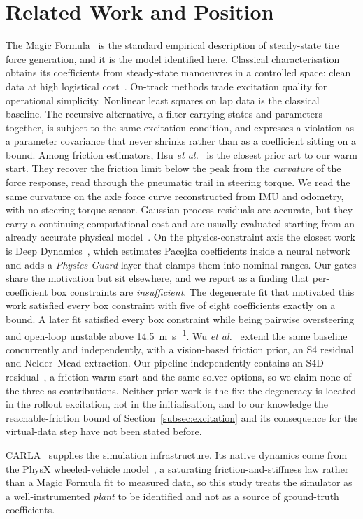 \section{Related Work and Position}
\label{sec:related}

The Magic Formula~\cite{pacejka2012book} is the standard empirical description
of steady-state tire force generation, and it is the model identified here.
Classical characterisation obtains its coefficients from steady-state
manoeuvres in a controlled space: clean data at high logistical
cost~\cite{ontrack2025}. On-track methods trade excitation quality for
operational simplicity. Nonlinear least squares on lap data is the classical
baseline. The recursive alternative, a filter carrying states and parameters
together, is subject to the same excitation condition, and expresses a
violation as a parameter covariance that never shrinks rather than as a
coefficient sitting on a bound. Among friction estimators, Hsu \emph{et al.}~\cite{hsu2010trail} is the closest
prior art to our warm start. They recover the friction limit below the peak
from the \emph{curvature} of the force response, read through the pneumatic
trail in steering torque. We read the same curvature on the axle force curve
reconstructed from IMU and odometry, with no steering-torque sensor.
Gaussian-process residuals are accurate, but they carry a continuing
computational cost and are usually evaluated starting from an already accurate
physical model~\cite{kabzan2019lbmpc}. On the physics-constraint axis the closest work is Deep
Dynamics~\cite{deepdynamics2024}, which estimates Pacejka coefficients inside a
neural network and adds a \emph{Physics Guard} layer that clamps them into
nominal ranges. Our gates share the motivation but sit elsewhere, and we report
as a finding that per-coefficient box constraints are \emph{insufficient}. The
degenerate fit that motivated this work satisfied every box constraint with
five of eight coefficients exactly on a bound. A later fit satisfied every box
constraint while being pairwise oversteering and open-loop unstable above
\SI{14.5}{\meter\per\second}. Wu \emph{et al.}~\cite{visionsysid2026} extend the
same baseline concurrently and independently, with a vision-based friction
prior, an S4 residual and Nelder--Mead extraction. Our pipeline independently
contains an S4D residual~\cite{gu2022s4d}, a friction warm start and the same
solver options, so we claim none of the three as contributions. Neither prior
work is the fix: the degeneracy is located in the rollout excitation, not in
the initialisation, and to our knowledge the reachable-friction bound of
Section~\ref{subsec:excitation} and its consequence for the virtual-data step
have not been stated before.

CARLA~\cite{carla2017} supplies the simulation infrastructure. Its native
dynamics come from the PhysX wheeled-vehicle model~\cite{physxvehicle}, a
saturating friction-and-stiffness law rather than a Magic Formula fit to
measured data, so this study treats the simulator as a well-instrumented
\emph{plant} to be identified and not as a source of ground-truth
coefficients.
